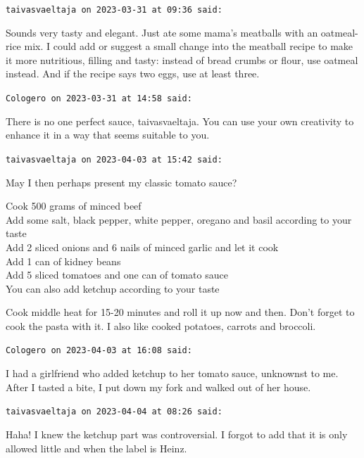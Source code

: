\begin{footnotesize}
\begin{sffamily}
\texttt{taivasvaeltaja on 2023-03-31 at 09:36 said:}

Sounds very tasty and elegant. Just ate some mama's meatballs with an oatmeal-rice mix. I could add or suggest a small change into the meatball recipe to make it more nutritious, filling and tasty: instead of bread crumbs or flour, use oatmeal instead. And if the recipe says two eggs, use at least three.

\hfill

\texttt{Cologero on 2023-03-31 at 14:58 said:}

There is no one perfect sauce, taivasvaeltaja. You can use your own creativity to enhance it in a way that seems suitable to you.

\hfill

\texttt{taivasvaeltaja on 2023-04-03 at 15:42 said:}

May I then perhaps present my classic tomato sauce?

Cook 500 grams of minced beef\\ Add some salt, black pepper, white pepper, oregano and basil according to your taste\\ Add 2 sliced onions and 6 nails of minced garlic and let it cook\\ Add 1 can of kidney beans\\ Add 5 sliced tomatoes and one can of tomato sauce\\ You can also add ketchup according to your taste

Cook middle heat for 15-20 minutes and roll it up now and then. Don't forget to cook the pasta with it. I also like cooked potatoes, carrots and broccoli.

\hfill

\texttt{Cologero on 2023-04-03 at 16:08 said:}

I had a girlfriend who added ketchup to her tomato sauce, unknownst to me. After I tasted a bite, I put down my fork and walked out of her house.

\hfill

\texttt{taivasvaeltaja on 2023-04-04 at 08:26 said:}

Haha! I knew the ketchup part was controversial. I forgot to add that it is only allowed little and when the label is Heinz.

\end{sffamily}
\end{footnotesize}


